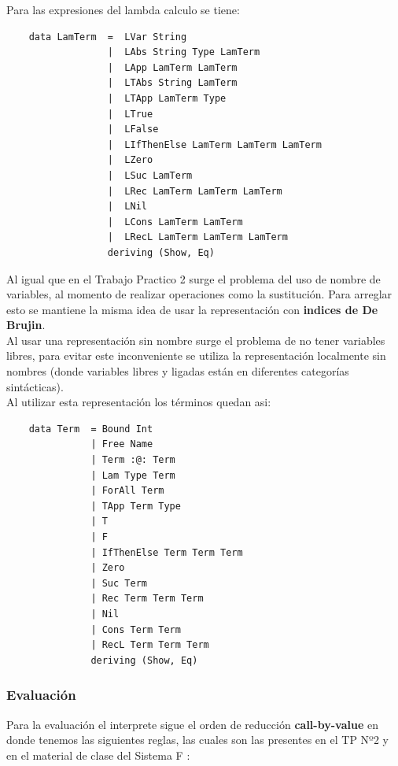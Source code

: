 \documentclass[12pt, titlepage, a4paper]{article}
\begin{document}
\noindent Para las expresiones del lambda calculo se tiene:
\begin{verbatim}
    data LamTerm  =  LVar String
                  |  LAbs String Type LamTerm
                  |  LApp LamTerm LamTerm
                  |  LTAbs String LamTerm
                  |  LTApp LamTerm Type
                  |  LTrue 
                  |  LFalse
                  |  LIfThenElse LamTerm LamTerm LamTerm
                  |  LZero
                  |  LSuc LamTerm
                  |  LRec LamTerm LamTerm LamTerm
                  |  LNil
                  |  LCons LamTerm LamTerm
                  |  LRecL LamTerm LamTerm LamTerm
                  deriving (Show, Eq)
\end{verbatim}

Al igual que en el Trabajo Practico 2 \cite{tp2:lambdaCalculoSimpleTipado} surge el problema del uso de nombre de variables, al 
momento de realizar operaciones como la sustitución. Para arreglar esto se mantiene la misma idea de 
usar la representación con \textbf{indices de De Brujin}. \\

Al usar una representación sin nombre surge el problema de no tener variables libres,  
para evitar este inconveniente se utiliza la representación localmente sin nombres (donde variables libres y ligadas están 
en diferentes categorías sintácticas). \\

\noindent Al utilizar esta representación los términos quedan asi:
\begin{verbatim}
    data Term  = Bound Int
               | Free Name 
               | Term :@: Term
               | Lam Type Term
               | ForAll Term
               | TApp Term Type
               | T
               | F
               | IfThenElse Term Term Term
               | Zero
               | Suc Term
               | Rec Term Term Term
               | Nil
               | Cons Term Term
               | RecL Term Term Term
               deriving (Show, Eq)
\end{verbatim}


\subsubsection{Evaluación}
Para la evaluación el interprete sigue el orden de reducción \textbf{call-by-value} en donde tenemos las siguientes reglas, las cuales 
son las presentes en el TP Nº2 \cite{tp2:lambdaCalculoSimpleTipado} y en el material de clase del Sistema F \cite{ALP:Polimorfismo}:
\end{document}
